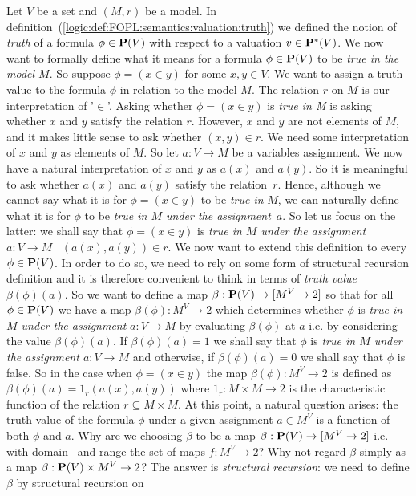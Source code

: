 
Let $V$ be a set and $(M,r)$ be a model. In
definition~(\ref{logic:def:FOPL:semantics:valuation:truth}) we
defined the notion of {\em truth} of a formula $\phi\in\mbox{${\bf P}(V)$}$ with
respect to a valuation $v\in\mbox{${\bf P}^{*}(V)$}$. We now want to formally define
what it means for a formula $\phi\in\mbox{${\bf P}(V)$}$ to be {\em true in the
model $M$}. So suppose $\phi=(x\in y)$ for some $x,y\in V$. We want
to assign a truth value to the formula $\phi$ in relation to the
model $M$. The relation $r$ on $M$ is our interpretation of '$\in$'.
Asking whether $\phi=(x\in y)$ is {\em true in M} is asking whether
$x$ and $y$ satisfy the relation $r$. However, $x$ and $y$ are not
elements of $M$, and it makes little sense to ask whether $(x,y)\in
r$. We need some interpretation of $x$ and $y$ as elements of $M$.
So let $a:V\to M$ be a variables assignment. We now have a natural
interpretation of $x$ and $y$ as $a(x)$ and $a(y)$. So it is
meaningful to ask whether $a(x)$ and $a(y)$ satisfy the
relation~$r$. Hence, although we cannot say what it is for
$\phi=(x\in y)$ to be {\em true in} $M$, we can naturally define
what it is for $\phi$ to be {\em true in $M$ under the
assignment}~$a$. So let us focus on the latter: we shall say that
$\phi=(x\in y)$ is {\em true in $M$ under the assignment $a:V\to M$}
\ifand\ $(a(x),a(y))\in r$. We now want to extend this definition to
every $\phi\in\mbox{${\bf P}(V)$}$. In order to do so, we need to rely on some form
of structural recursion definition and it is therefore convenient to
think in terms of {\em truth value} $\beta(\phi)(a)$. So we want to
define a map $\beta:\mbox{${\bf P}(V)$}\to[M^{V}\to 2]$ so that for all $\phi\in\mbox{${\bf P}(V)$}$
we have a map $\beta(\phi):M^{V}\to 2$ which determines whether
$\phi$ is {\em true in $M$ under the assignment} $a:V\to M$ by
evaluating $\beta(\phi)$ at $a$ i.e. by considering the value
$\beta(\phi)(a)$. If $\beta(\phi)(a)=1$ we shall say that $\phi$ is
{\em true in $M$ under the assignment $a:V\to M$} and otherwise, if
$\beta(\phi)(a)=0$ we shall say that $\phi$ is false. So in the case
when $\phi=(x\in y)$ the map $\beta(\phi):M^{V}\to 2$ is defined as
$\beta(\phi)(a)=1_{r}(a(x),a(y))$ where $1_{r}:M\times M\to 2$ is
the characteristic function of the relation $r\subseteq M\times M$.
At this point, a natural question arises: the truth value of the
formula $\phi$ under a given assignment $a\in M^{V}$ is a function
of both $\phi$ and $a$. Why are we choosing $\beta$ to be a map
$\beta:\mbox{${\bf P}(V)$}\to[M^{V}\to 2]$ i.e. with domain \pv\ and range the set
of maps $f:M^{V}\to 2$? Why not regard $\beta$ simply as a map
$\beta:\mbox{${\bf P}(V)$}\times M^{V}\to 2$? The answer is {\em structural
recursion}: we need to define $\beta$ by structural recursion on
